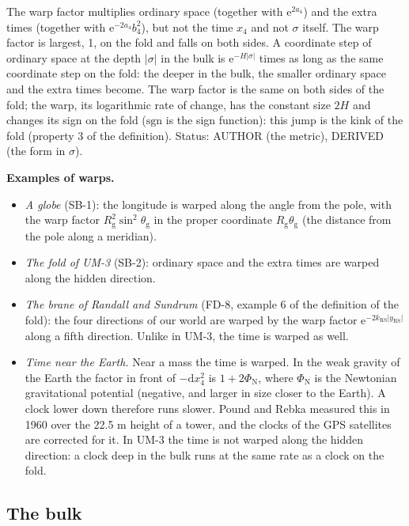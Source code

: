 \documentclass[
  10pt,
]{article}
\providecommand{\tightlist}{%
  \setlength{\itemsep}{0pt}\setlength{\parskip}{0pt}}
\begin{document}
The warp factor multiplies ordinary space (together with
\(\mathrm{e}^{2a_4}\)) and the extra times (together with
\(\mathrm{e}^{-2a_4}b_4^2\)), but not the time \(x_4\) and not
\(\sigma\) itself. The warp factor is largest, 1, on the fold and falls
on both sides. A coordinate step of ordinary space at the depth
\(\lvert\sigma\rvert\) in the bulk is
\(\mathrm{e}^{-H\lvert\sigma\rvert}\) times as long as the same
coordinate step on the fold: the deeper in the bulk, the smaller
ordinary space and the extra times become. The warp factor is the same
on both sides of the fold; the warp, its logarithmic rate of change, has
the constant size \(2H\) and changes its sign on the fold
(\(\mathrm{sgn}\) is the sign function): this jump is the kink of the
fold (property 3 of the definition). Status: AUTHOR (the metric),
DERIVED (the form in \(\sigma\)).

\textbf{Examples of warps.}

\begin{itemize}
\tightlist
\item
  \emph{A globe} (SB-1): the longitude is warped along the angle from
  the pole, with the warp factor
  \(R_{\mathrm{g}}^2\sin^2\theta_{\mathrm{g}}\) in the proper coordinate
  \(R_{\mathrm{g}}\theta_{\mathrm{g}}\) (the distance from the pole
  along a meridian).
\item
  \emph{The fold of UM-3} (SB-2): ordinary space and the extra times are
  warped along the hidden direction.
\item
  \emph{The brane of Randall and Sundrum} (FD-8, example 6 of the
  definition of the fold): the four directions of our world are warped
  by the warp factor
  \(\mathrm{e}^{-2k_{\mathrm{RS}}\lvert y_{\mathrm{RS}}\rvert}\) along a
  fifth direction. Unlike in UM-3, the time is warped as well.
\item
  \emph{Time near the Earth.} Near a mass the time is warped. In the
  weak gravity of the Earth the factor in front of \(-\mathrm{d}x_4^2\)
  is \(1 + 2\Phi_{\mathrm{N}}\), where \(\Phi_{\mathrm{N}}\) is the
  Newtonian gravitational potential (negative, and larger in size closer
  to the Earth). A clock lower down therefore runs slower. Pound and
  Rebka measured this in 1960 over the 22.5 m height of a tower, and the
  clocks of the GPS satellites are corrected for it. In UM-3 the time is
  not warped along the hidden direction: a clock deep in the bulk runs
  at the same rate as a clock on the fold.
\end{itemize}

\hypertarget{the-bulk}{%
\subsection{The bulk}\label{the-bulk}}
\end{document}
